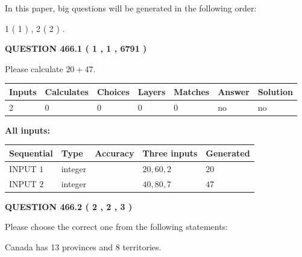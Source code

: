 \documentclass[12pt]{article}
\begin{document}
In this paper, big questions will be generated in the following order: 
   
   
   1 ( 1 )
 ,
   2 ( 2 )
 .
  
\vspace{0.2in}
  
{\textbf{\Large{QUESTION
466.1 
 ( 1 , 1 , 6791 )
}}}
  
  
 
Please calculate $ %
20 +  %
47 $.
 
 
   
   
   
   
\noindent\begin{tabular}{|l|l|l|l|l|l|l|}
 \hline
Inputs & Calculates & Choices & Layers & Matches & Answer & Solution \\ \hline
 2  & 
 0  & 
 0
  & 
 0  & 
 0  & 
  no & 
  no 
  \\ \hline
 \end{tabular}
   
   
   
   
\noindent{}
   
   
   
   
\noindent\vspace{0.1in}\hspace{-0.08in} {\textbf{\Large{All inputs: }}}
   
   
  
  
\noindent\begin{tabular}{|l|l|l|l|l|}
\hline
 Sequential & Type & Accuracy & Three inputs & Generated \\ 
\hline
 
 
  INPUT $  1 $ & integer &  & $
 20
 , 
 60
 , 
 2
 $ & $ 20 $ 
 \\  \hline  
 
 
  INPUT $  2 $ & integer &  & $
 40
 , 
 80
 , 
 7
 $ & $ 47 $ 
 \\  \hline  
 \end{tabular}
   
   
  
\vspace{0.2in}
  
{\textbf{\Large{QUESTION
466.2 
 ( 2 , 2 , 3 )
}}}
  
  
Please choose the correct one from the following statements:
 
 
Canada has  13 provinces and  8 territories.
 
\end{document}
